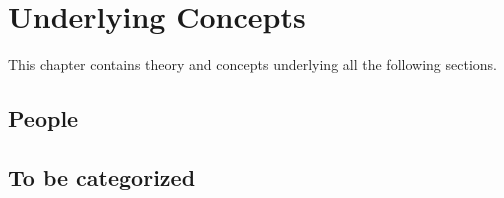 \chapter{Underlying Concepts} \label{chap:concepts}
This chapter contains theory and concepts underlying all the following sections.

\section{People}



\section{To be categorized}
